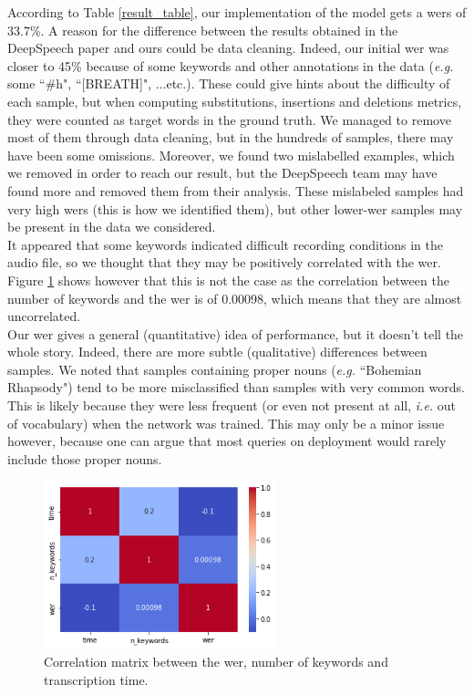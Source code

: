 \documentclass[12pt]{article}
\begin{document}
According to Table \ref{result_table}, our implementation of the model gets a \glspl{wer} of 33.7\%. A reason for the difference between the results obtained in the DeepSpeech paper and ours could be data cleaning. Indeed, our initial \gls{wer} was closer to 45\% because of some keywords and other annotations in the data (\textit{e.g.} some ``\#h", ``[BREATH]", ...etc.). These could give hints about the difficulty of each sample, but when computing substitutions, insertions and deletions metrics, they were counted as target words in the ground truth. We managed to remove most of them through data cleaning, but in the hundreds of samples, there may have been some omissions. Moreover, we found two mislabelled examples, which we removed in order to reach our result, but the DeepSpeech team may have found more and removed them from their analysis. These mislabeled samples had very high \glspl{wer} (this is how we identified them), but other lower-\gls{wer} samples may be present in the data we considered. \\
It appeared that some keywords indicated difficult recording conditions in the audio file, so we thought that they may be positively correlated with the \gls{wer}. Figure \ref{fig: correlation_matrix} shows however that this is not the case as the correlation between the number of keywords and the \gls{wer} is of 0.00098, which means that they are almost uncorrelated. \\
Our \gls{wer} gives a general (quantitative) idea of performance, but it doesn't tell the whole story. Indeed, there are more subtle (qualitative) differences between samples. We noted that samples containing proper nouns (\textit{e.g.} ``Bohemian Rhapsody") tend to be more misclassified than samples with very common words. This is likely because they were less frequent (or even not present at all, \textit{i.e.} out of vocabulary) when the network was trained. This may only be a minor issue however, because one can argue that most queries on deployment would rarely include those proper nouns.
\begin{figure}
    \centering
    \includegraphics[width=0.6\textwidth]{images/corr_mat.png}
    \caption{Correlation matrix between the \gls{wer}, number of keywords and transcription time.}
    \label{fig: correlation_matrix}
\end{figure}
\end{document}
